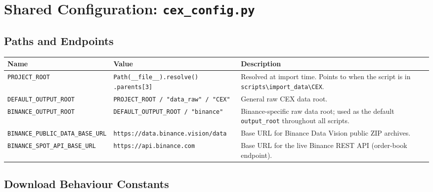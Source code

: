 \documentclass[11pt,a4paper]{article}
\begin{document}
\section{Shared Configuration: \texttt{cex\_config.py}}
\label{sec:config}

\subsection{Paths and Endpoints}

\begin{xltabular}{\linewidth}{L{5.2cm}L{4.5cm}Y}
\toprule
\textbf{Name} & \textbf{Value} & \textbf{Description} \\
\midrule
\texttt{PROJECT\_ROOT} &
  \texttt{Path(\_\_file\_\_).resolve()} \newline \texttt{.parents[3]} &
  Resolved at import time. Points to
   when the script is in
  \texttt{scripts\textbackslash import\_data\textbackslash CEX}. \\
\texttt{DEFAULT\_OUTPUT\_ROOT} &
  \texttt{PROJECT\_ROOT / "data\_raw" / "CEX"} &
  General raw CEX data root. \\
\texttt{BINANCE\_OUTPUT\_ROOT} &
  \texttt{DEFAULT\_OUTPUT\_ROOT / "binance"} &
  Binance-specific raw data root; used as the default
  \texttt{output\_root} throughout all scripts. \\
\texttt{BINANCE\_PUBLIC\_DATA\_BASE\_URL} &
  \texttt{https://data.binance.vision/data} &
  Base URL for Binance Data Vision public ZIP archives. \\
\texttt{BINANCE\_SPOT\_API\_BASE\_URL} &
  \texttt{https://api.binance.com} &
  Base URL for the live Binance REST API (order-book endpoint). \\
\bottomrule
\end{xltabular}

\subsection{Download Behaviour Constants}
\end{document}

